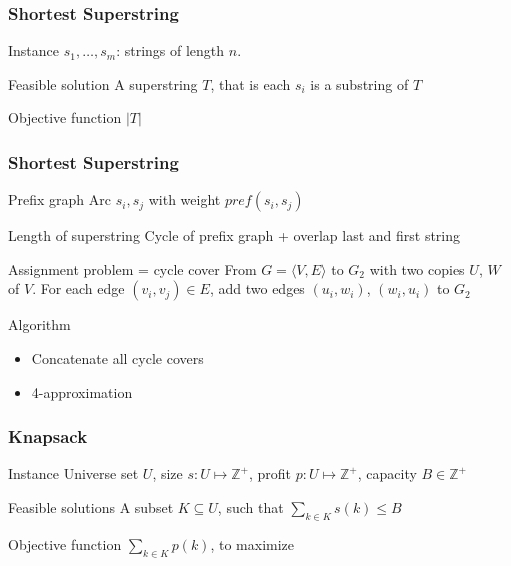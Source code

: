 \documentclass[12pt,aspectratio=169]{beamer}
\begin{document}
  \begin{frame}\frametitle{Shortest Superstring }
  \begin{block}{Instance}
      $s_{1}, \ldots, s_{m}$: strings of length $n$.
  \end{block}
  \begin{block}{Feasible solution}
    A superstring $T$, that is each $s_{i}$ is a substring of $T$
%
  \end{block}
  \begin{block}{Objective function}
    $|T|$
  \end{block}
\end{frame} 


  \begin{frame}\frametitle{Shortest Superstring }
  \begin{block}{Prefix graph}
      Arc $s_{i}, s_{j}$ with weight $pref(s_{i}, s_{j})$
  \end{block}
  \begin{block}{Length of superstring}
    Cycle of prefix graph + overlap last and first string
%
  \end{block}
  \begin{block}{Assignment problem = cycle cover}
    From $G=\langle V, E\rangle$ to $G_{2}$ with two copies $U$, $W$ of $V$.
%
    For each edge $(v_{i}, v_{j})\in E$, add two edges $(u_{i}, w_{i})$, $(w_{i}, u_{i})$
    to $G_{2}$
  \end{block}
  \begin{block}{Algorithm}
    \begin{itemize}
    \item
      Concatenate all cycle covers
    \item
      4-approximation
    \end{itemize}
  \end{block}
\end{frame} 


\begin{frame}\frametitle{Knapsack }
  \begin{block}{Instance}
    Universe set $U$, size $s: U \mapsto \mathbb{Z}^{+}$, profit $p: U \mapsto
    \mathbb{Z}^{+}$, capacity $B\in \mathbb{Z}^{+}$
%
  \end{block}
  \begin{block}{Feasible solutions}
    A subset $K\subseteq U$, such that $\sum_{k\in K}s(k) \le B$
  \end{block}
  \begin{block}{Objective function}
    $\sum_{k\in K} p(k)$, to maximize
  \end{block}
\end{frame}
\end{document}
